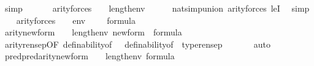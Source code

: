 \begin{isabellebody}
\ simp\isanewline
\ \ \isamarkupfalse%
\isanewline
\ \ \isamarkupfalse%
\ {\isachardoublequoteopen}arity{\isacharparenleft}{\kern0pt}forces{\isacharparenleft}{\kern0pt}{\isacharquery}{\kern0pt}{\isasymchi}{\isacharparenright}{\kern0pt}{\isacharparenright}{\kern0pt}\ {\isasymle}\ {}\ {\isacharhash}{\kern0pt}{\isacharplus}{\kern0pt}\ length{\isacharparenleft}{\kern0pt}env{\isacharparenright}{\kern0pt}{\isachardoublequoteclose}\isanewline
\ \ \ \ \isamarkupfalse%
\ nat{\isacharunderscore}{\kern0pt}simp{\isacharunderscore}{\kern0pt}union\ arity{\isacharunderscore}{\kern0pt}forces\ leI\ \isamarkupfalse%
\ simp\isanewline
\ \ \isamarkupfalse%
\ {\isacartoucheopen}arity{\isacharparenleft}{\kern0pt}forces{\isacharparenleft}{\kern0pt}{\isacharquery}{\kern0pt}{\isasymchi}{\isacharparenright}{\kern0pt}{\isacharparenright}{\kern0pt}\ {\isasymle}{}\ {\isacharhash}{\kern0pt}{\isacharplus}{\kern0pt}\ {\isacharunderscore}{\kern0pt}{\isacartoucheclose}\ {\isacartoucheopen}env\ {\isasymin}\ {\isacharunderscore}{\kern0pt}{\isacartoucheclose}\ {\isacartoucheopen}{\isasymphi}\ {\isasymin}\ formula{\isacartoucheclose}\isanewline
\ \ \isamarkupfalse%
\ {\isachardoublequoteopen}arity{\isacharparenleft}{\kern0pt}{\isacharquery}{\kern0pt}new{\isacharunderscore}{\kern0pt}form{\isacharparenright}{\kern0pt}\ {\isasymle}\ {}\ {\isacharhash}{\kern0pt}{\isacharplus}{\kern0pt}\ length{\isacharparenleft}{\kern0pt}env{\isacharparenright}{\kern0pt}{\isachardoublequoteclose}\ {\isachardoublequoteopen}{\isacharquery}{\kern0pt}new{\isacharunderscore}{\kern0pt}form\ {\isasymin}\ formula{\isachardoublequoteclose}\isanewline
\ \ \ \ \isamarkupfalse%
\ arity{\isacharunderscore}{\kern0pt}rensep{\isacharbrackleft}{\kern0pt}OF\ definability{\isacharbrackleft}{\kern0pt}of\ {\isachardoublequoteopen}{\isacharquery}{\kern0pt}{\isasymchi}{\isachardoublequoteclose}{\isacharbrackright}{\kern0pt}{\isacharbrackright}{\kern0pt}\ \ definability{\isacharbrackleft}{\kern0pt}of\ {\isachardoublequoteopen}{\isacharquery}{\kern0pt}{\isasymchi}{\isachardoublequoteclose}{\isacharbrackright}{\kern0pt}\ type{\isacharunderscore}{\kern0pt}rensep\ \isanewline
\ \ \ \ \isamarkupfalse%
\ auto\isanewline
\ \ \isamarkupfalse%
\isanewline
\ \ \isamarkupfalse%
\ {\isachardoublequoteopen}pred{\isacharparenleft}{\kern0pt}pred{\isacharparenleft}{\kern0pt}arity{\isacharparenleft}{\kern0pt}{\isacharquery}{\kern0pt}new{\isacharunderscore}{\kern0pt}form{\isacharparenright}{\kern0pt}{\isacharparenright}{\kern0pt}{\isacharparenright}{\kern0pt}\ {\isasymle}\ {}\ {\isacharhash}{\kern0pt}{\isacharplus}{\kern0pt}\ length{\isacharparenleft}{\kern0pt}env{\isacharparenright}{\kern0pt}{\isachardoublequoteclose}\ {\isachardoublequoteopen}{\isacharquery}{\kern0pt}{\isasympsi}{\isasymin}formula{\isachardoublequoteclose}\isanewline

\end{isabellebody}
